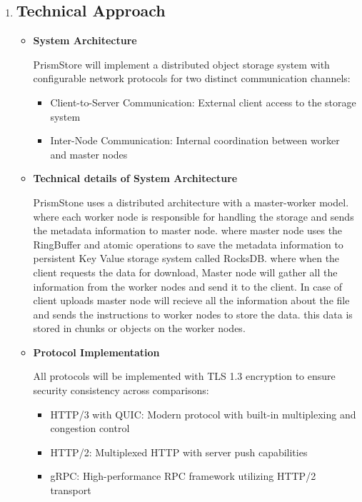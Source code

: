 \documentclass[12pt]{article}
\begin{document}
\begin{enumerate}
    \item \subsection*{Technical Approach}

        \begin{itemize}
            \item \textbf{System Architecture}

                PrismStore will implement a distributed object storage system with configurable network protocols for two distinct communication channels:
                \begin{itemize}
                    \item Client-to-Server Communication: External client access to the storage system
                    \item Inter-Node Communication: Internal coordination between worker and master nodes
                \end{itemize}

            \item \textbf{Technical details of System Architecture}

                PrismStone uses a distributed architecture with a master-worker model. where each worker node is responsible for handling the storage and sends
                the metadata information to master node. where master node uses the RingBuffer and atomic operations to save the metadata information to persistent
                Key Value storage system called RocksDB. where when the client requests the data for download, Master node will gather all the information from the worker
                nodes and send it to the client. In case of client uploads master node will recieve all the information about the file and sends the instructions to worker
                nodes to store the data. this data is stored in chunks or objects on the worker nodes.


            \item \textbf{Protocol Implementation}

                All protocols will be implemented with TLS 1.3 encryption to ensure security consistency across comparisons:
                    \begin{itemize}
                        \item HTTP/3 with QUIC: Modern protocol with built-in multiplexing and congestion control
                        \item HTTP/2: Multiplexed HTTP with server push capabilities
                        \item gRPC: High-performance RPC framework utilizing HTTP/2 transport
                    \end{itemize}


\end{itemize}
\end{enumerate}
\end{document}
